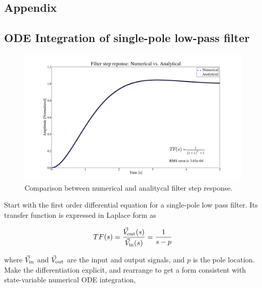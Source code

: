 \documentclass[a4paper,12pt]{article}
\begin{document}
\begin{appendix}

\section{Appendix}

\subsection{ODE Integration of single-pole low-pass filter}
\label{App:ODE_integration}

\begin{figure}
\centering
\includegraphics[scale=0.265]{../figures/filter_step_response.png}
\caption{Comparison between numerical and analitycal filter step response.}
\label{fig:filter_step_response}
\end{figure}


Start with the first order differential equation for a single-pole low pass filter. Its transfer function is expressed in Laplace form as

\begin{equation}
 TF(s)=\frac{\vec V_{\rm out}(s)}{\vec V_{\rm in}(s)} = \frac{1}{s-p}
\end{equation}

\noindent where $\vec V_{\rm in}$ and $\vec V_{\rm out}$ are the input and output signals, and $p$ is the pole location. Make the differentiation explicit, and rearrange to get a form consistent with state-variable numerical ODE integration,


\end{appendix}
\end{document}
